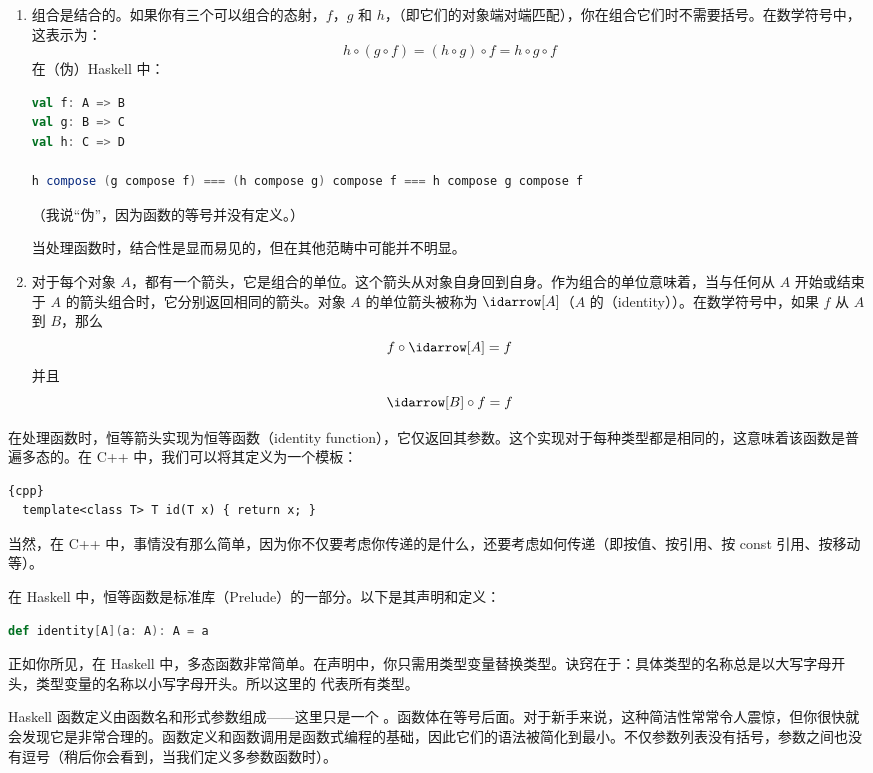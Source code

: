 \begin{enumerate}
  \item
  组合是结合的。如果你有三个可以组合的态射，$f$，$g$ 和 $h$，（即它们的对象端对端匹配），你在组合它们时不需要括号。在数学符号中，这表示为：
  \[h \circ (g \circ f) = (h \circ g) \circ f = h \circ g \circ f\]
  在（伪）Haskell 中：

\begin{lstlisting}[language=Scala]
val f: A => B
val g: B => C
val h: C => D

h compose (g compose f) === (h compose g) compose f === h compose g compose f
\end{lstlisting}
  （我说“伪”，因为函数的等号并没有定义。）

  当处理函数时，结合性是显而易见的，但在其他范畴中可能并不明显。

  \item
  对于每个对象 $A$，都有一个箭头，它是组合的单位。这个箭头从对象自身回到自身。作为组合的单位意味着，当与任何从 $A$ 开始或结束于 $A$ 的箭头组合时，它分别返回相同的箭头。对象 $A$ 的单位箭头被称为 $\idarrow[A]$（$A$ 的（identity））。在数学符号中，如果 $f$ 从 $A$ 到 $B$，那么
  \[f \circ \idarrow[A] = f\]
  并且
  \[\idarrow[B] \circ f = f\]
\end{enumerate}
在处理函数时，恒等箭头实现为恒等函数（identity function），它仅返回其参数。这个实现对于每种类型都是相同的，这意味着该函数是普遍多态的。在 C++ 中，我们可以将其定义为一个模板：

\begin{lstlisting}{cpp}
  template<class T> T id(T x) { return x; }
\end{lstlisting}
当然，在 C++ 中，事情没有那么简单，因为你不仅要考虑你传递的是什么，还要考虑如何传递（即按值、按引用、按 const 引用、按移动等）。

在 Haskell 中，恒等函数是标准库（Prelude）的一部分。以下是其声明和定义：

\begin{lstlisting}[language=Scala]
def identity[A](a: A): A = a
\end{lstlisting}
正如你所见，在 Haskell 中，多态函数非常简单。在声明中，你只需用类型变量替换类型。诀窍在于：具体类型的名称总是以大写字母开头，类型变量的名称以小写字母开头。所以这里的  代表所有类型。

Haskell 函数定义由函数名和形式参数组成——这里只是一个 。函数体在等号后面。对于新手来说，这种简洁性常常令人震惊，但你很快就会发现它是非常合理的。函数定义和函数调用是函数式编程的基础，因此它们的语法被简化到最小。不仅参数列表没有括号，参数之间也没有逗号（稍后你会看到，当我们定义多参数函数时）。

